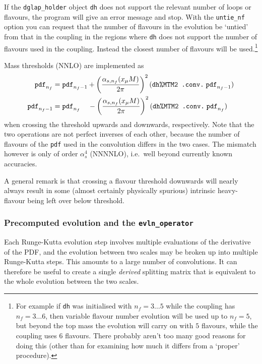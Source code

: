 \documentclass[12pt]{article}
\newcommand{\as}{\alpha_s}
\newcommand{\ie}{i.e.\ }
\newcommand{\ttt}[1]{\texttt{#1}}
\begin{document}
If the \ttt{dglap\_holder} object \ttt{dh} does not support the
relevant number of loops or flavours, the program will give an error
message and stop. With the \ttt{untie\_nf} option you can request that
the number of flavours in the evolution be `untied' from that in the
coupling in the regions where \ttt{dh} does not support the number of
flavours used in the coupling. Instead the closest number of flavours
will be used.\footnote{For example if \ttt{dh} was initialised with
  $n_f = 3\ldots5$ while the coupling has $n_f = 3\ldots 6$, then
  variable flavour number evolution will be used up to $n_f = 5$, but
  beyond the top mass the evolution will carry on with $5$ flavours,
  while the coupling uses $6$ flavours. There probably aren't too many
  good reasons for doing this (other than for examining how much it
  differs from a `proper' procedure).}

Mass thresholds (NNLO) are implemented as
\begin{subequations}
\label{eq:mass_threshold}
\begin{align}
  \ttt{pdf}_{n_f} &= \ttt{pdf}_{n_f-1} +
  \left(\frac{\alpha_{s,n_f}(x_\mu M)}{2\pi}\right)^2
  (\mbox{\ttt{dh\%MTM2 .conv.}}\; \ttt{pdf}_{n_f-1})\\
  \ttt{pdf}_{n_f-1} &= \ttt{pdf}_{n_f} \;\;\;\;-
  \left(\frac{\alpha_{s,n_f}(x_\mu M)}{2\pi}\right)^2
  (\mbox{\ttt{dh\%MTM2 .conv.}}\; \ttt{pdf}_{n_f})
\end{align}
\end{subequations}
when crossing the threshold upwards and downwards, respectively. Note
that the two operations are not perfect inverses of each other,
because the number of flavours of the \ttt{pdf} used in the
convolution differs in the two cases. The mismatch however is only of
order $\as^4$ (NNNNLO), \ie well beyond currently known accuracies.

A general remark is that crossing a flavour threshold downwards will
nearly always result in some (almost certainly physically spurious)
intrinsic heavy-flavour being left over below threshold.

\subsubsection{Precomputed evolution and the \ttt{evln\_operator}}
\label{sec:precomputed-evolution}

Each Runge-Kutta evolution step involves multiple evaluations of the
derivative of the PDF, and the evolution between two scales may be
broken up into multiple Runge-Kutta steps. This amounts to a large
number of convolutions. It can therefore be useful to create a single
\emph{derived} splitting matrix that is equivalent to the whole
evolution between the two scales. 
\end{document}
